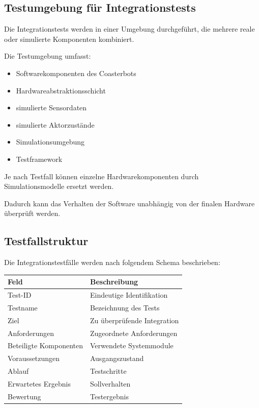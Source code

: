 \subsection{Testumgebung für
Integrationstests}\label{testumgebung-fuxfcr-integrationstests}

Die Integrationstests werden in einer Umgebung durchgeführt, die mehrere
reale oder simulierte Komponenten kombiniert.

Die Testumgebung umfasst:

\begin{itemize}
\tightlist
\item
  Softwarekomponenten des Coasterbots
\item
  Hardwareabstraktionsschicht
\item
  simulierte Sensordaten
\item
  simulierte Aktorzustände
\item
  Simulationsumgebung
\item
  Testframework
\end{itemize}

Je nach Testfall können einzelne Hardwarekomponenten durch
Simulationsmodelle ersetzt werden.

Dadurch kann das Verhalten der Software unabhängig von der finalen
Hardware überprüft werden.

\subsection{Testfallstruktur}\label{testfallstruktur-1}

Die Integrationstestfälle werden nach folgendem Schema beschrieben:

\begin{longtable}[]{@{}ll@{}}
\toprule\noalign{}
Feld & Beschreibung \\
\midrule\noalign{}
\endhead
\bottomrule\noalign{}
\endlastfoot
Test-ID & Eindeutige Identifikation \\
Testname & Bezeichnung des Tests \\
Ziel & Zu überprüfende Integration \\
Anforderungen & Zugeordnete Anforderungen \\
Beteiligte Komponenten & Verwendete Systemmodule \\
Voraussetzungen & Ausgangszustand \\
Ablauf & Testschritte \\
Erwartetes Ergebnis & Sollverhalten \\
Bewertung & Testergebnis \\
\end{longtable}

